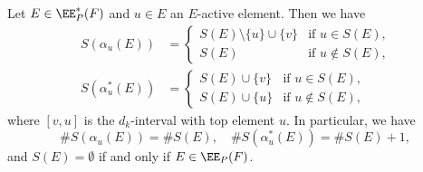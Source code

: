 \begin{lemm}
\label{lem:SE1}
Let $E \in \EE^*_P(F)$ and $u \in E$ an $E$-active element.
Then we have
\begin{align}
\label{eq:SE11}
S(\alpha_u(E))
 &=
\begin{cases}
 S(E) \setminus \{ u \} \cup \{ v \} &\text{if $u \in S(E)$,} \\
 S(E) &\text{if $u \not\in S(E)$,}
\end{cases}
\\
\label{eq:SE12}
S(\alpha^*_u(E))
 &=
\begin{cases}
 S(E) \cup \{ v \} &\text{if $u \in S(E)$,} \\
 S(E) \cup \{ u \} &\text{if $u \not\in S(E)$,}
\end{cases}
\end{align}
where $[v,u]$ is the $d_k$-interval with top element $u$.
In particular, we have
$$
\# S(\alpha_u(E)) = \# S(E),
\quad
\# S(\alpha^*_u(E)) = \# S(E) + 1,
$$
and $S(E) = \emptyset$ if and only if $E \in \EE_P(F)$.
\end{lemm}

